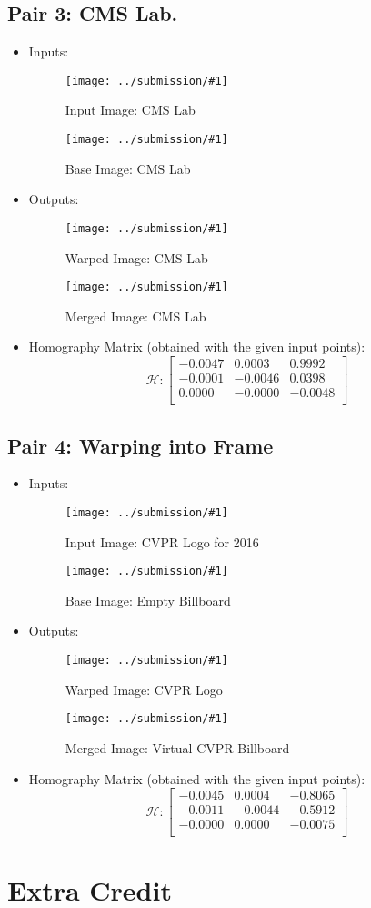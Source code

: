 \documentclass{article}
\newcommand{\listFigure}[3]{ \begin{figure}[H]
\texttt{[image: ../submission/\#1]}
		\caption{#2\label{fig:#3}}
	\end{figure}		
}
\begin{document}
\subsection{Pair 3: CMS Lab.}
\begin{itemize}
\item Inputs: 
	\listFigure{input-k-3.png}{Input Image: CMS Lab}{cmsinput-1}
	\listFigure{base-k-3.png}{Base Image: CMS Lab}{cmsinput-2}
	\item Outputs:
	\listFigure{warpIm-k-3.png}{Warped Image: CMS Lab}{cmswarp}
	\listFigure{mergeIm-k-3.png}{Merged Image: CMS Lab}{cmsmerge}
	\item Homography Matrix (obtained with the given input points):
	$$ \mathcal{H}: \begin{bmatrix}
   -0.0047 &  0.0003 &  0.9992 \\
   -0.0001 & -0.0046 &  0.0398 \\
    0.0000 & -0.0000 & -0.0048 \\
	\end{bmatrix}$$
\end{itemize}

\subsection{Pair 4: Warping into Frame}
\begin{itemize}
\item Inputs:
	\listFigure{input-frame.png}{Input Image: CVPR Logo for 2016}{frame-1}
	\listFigure{base-frame.png}{Base Image: Empty Billboard}{frame-2}
	\item Outputs:
	\listFigure{warpIm-frame.png}{Warped Image: CVPR Logo}{framewarp}
	\listFigure{mergeIm-frame.png}{Merged Image: Virtual CVPR
	Billboard}{framemerge}
	\item Homography Matrix (obtained with the given input points):
	$$ \mathcal{H}: \begin{bmatrix}
   -0.0045 &   0.0004 &  -0.8065 \\
   -0.0011 &  -0.0044 &  -0.5912 \\
   -0.0000 &   0.0000 &  -0.0075 \\
	\end{bmatrix}$$
\end{itemize}
\label{Extra Credit}
\section{Extra Credit}
\end{document}
